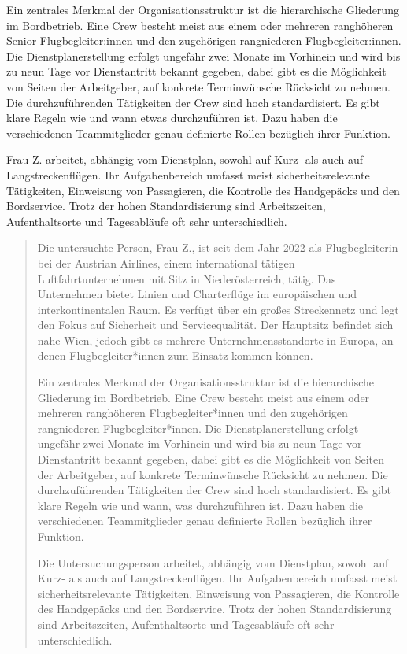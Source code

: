 \documentclass[12pt, a4paper]{article}
\begin{document}
Ein zentrales Merkmal der Organisationsstruktur ist die hierarchische Gliederung im Bordbetrieb.
Eine Crew besteht meist aus einem oder mehreren ranghöheren Senior Flugbegleiter:innen und den zugehörigen rangniederen Flugbegleiter:innen.
Die Dienstplanerstellung erfolgt ungefähr zwei Monate im Vorhinein und wird bis zu neun Tage vor Dienstantritt bekannt gegeben, 
dabei gibt es die Möglichkeit von Seiten der Arbeitgeber, auf konkrete Terminwünsche Rücksicht zu nehmen.
Die durchzuführenden Tätigkeiten der Crew sind hoch standardisiert. Es gibt klare Regeln wie und wann etwas durchzuführen ist. 
Dazu haben die verschiedenen Teammitglieder genau definierte Rollen bezüglich ihrer Funktion.

Frau Z. arbeitet, abhängig vom Dienstplan, sowohl auf Kurz- als auch auf Langstreckenflügen. 
Ihr Aufgabenbereich umfasst meist sicherheitsrelevante Tätigkeiten,
Einweisung von Passagieren, die Kontrolle des Handgepäcks und den Bordservice.
Trotz der hohen Standardisierung sind Arbeitszeiten, Aufenthaltsorte und Tagesabläufe oft sehr unterschiedlich.

\blockquote{
    \tiny
Die untersuchte Person, Frau Z., ist seit dem Jahr 2022 als Flugbegleiterin bei der Austrian Airlines, 
einem international tätigen Luftfahrtunternehmen mit Sitz in Niederösterreich, 
tätig. Das Unternehmen bietet Linien und Charterflüge im europäischen und interkontinentalen Raum. 
Es verfügt über ein großes Streckennetz und legt den Fokus auf Sicherheit und Servicequalität. 
Der Hauptsitz befindet sich nahe Wien, jedoch gibt es mehrere Unternehmensstandorte in Europa, an denen Flugbegleiter*innen zum Einsatz kommen können.

Ein zentrales Merkmal der Organisationsstruktur ist die hierarchische Gliederung im Bordbetrieb.
Eine Crew besteht meist aus einem oder mehreren ranghöheren Flugbegleiter*innen und den zugehörigen rangniederen Flugbegleiter*innen.
Die Dienstplanerstellung erfolgt ungefähr zwei Monate im Vorhinein und wird bis zu neun Tage vor Dienstantritt bekannt gegeben, 
dabei gibt es die Möglichkeit von Seiten der Arbeitgeber, auf konkrete Terminwünsche Rücksicht zu nehmen.
Die durchzuführenden Tätigkeiten der Crew sind hoch standardisiert. Es gibt klare Regeln wie und wann, was durchzuführen ist. 
Dazu haben die verschiedenen Teammitglieder genau definierte Rollen bezüglich ihrer Funktion.

Die Untersuchungsperson arbeitet, abhängig vom Dienstplan, sowohl auf Kurz- als auch auf Langstreckenflügen. 
Ihr Aufgabenbereich umfasst meist sicherheitsrelevante Tätigkeiten,
Einweisung von Passagieren, die Kontrolle des Handgepäcks und den Bordservice.
Trotz der hohen Standardisierung sind Arbeitszeiten, Aufenthaltsorte und Tagesabläufe oft sehr unterschiedlich.
}
\end{document}

